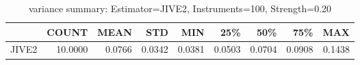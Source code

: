 \begin{table}[ht]
\centering
\caption{variance summary: Estimator=JIVE2, Instruments=100, Strength=0.20}
\begin{tabular}{lrrrrrrrr}
\toprule
 & COUNT & MEAN & STD & MIN & 25\% & 50\% & 75\% & MAX \\
\midrule
JIVE2 & 10.0000 & 0.0766 & 0.0342 & 0.0381 & 0.0503 & 0.0704 & 0.0908 & 0.1438 \\
\bottomrule
\end{tabular}
\end{table}
